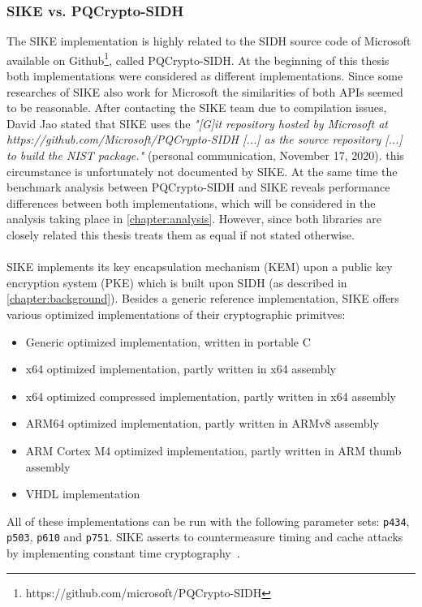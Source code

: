 \subsubsection{SIKE vs. PQCrypto-SIDH}\label{existing:sike_vs_pqcrypto}
The \gls{SIKE} implementation is highly related to the \gls{SIDH} source code of Microsoft available on Github\footnote{https://github.com/microsoft/PQCrypto-SIDH}, called \gls{PQCrypto-SIDH}. At the beginning of this thesis both implementations were considered as different implementations. Since some researches of \gls{SIKE} also work for Microsoft the similarities of both APIs seemed to be reasonable. After contacting the \gls{SIKE} team due to compilation issues, David Jao stated that \gls{SIKE} uses the \textit{"[G]it repository hosted by Microsoft at
https://github.com/Microsoft/PQCrypto-SIDH [...] as the source
repository [...] to build the NIST package."} (personal communication, November 17, 2020). this circumstance is unfortunately not documented by \gls{SIKE}. At the same time the benchmark analysis between \gls{PQCrypto-SIDH} and \gls{SIKE} reveals performance differences between both implementations, which will be considered in the analysis taking place in \autoref{chapter:analysis}. However, since both libraries are closely related this thesis treats them as equal if not stated otherwise.
\\\\
\gls{SIKE} implements its key encapsulation mechanism (\gls{KEM}) upon a public key encryption system (\gls{PKE}) which is built upon \gls{SIDH} (as described in \autoref{chapter:background}). Besides a generic reference implementation, \gls{SIKE} offers various optimized implementations of their cryptographic primitves:
\begin{itemize}
  \item Generic optimized implementation, written in portable C
  \item x64 optimized implementation, partly written in x64 assembly
  \item x64 optimized compressed implementation, partly written in x64 assembly
  \item ARM64 optimized implementation, partly written in ARMv8 assembly
  \item ARM Cortex M4 optimized implementation, partly written in ARM thumb assembly
  \item VHDL implementation
\end{itemize}
All of these implementations can be run with the following parameter sets: \texttt{p434}, \texttt{p503}, \texttt{p610} and \texttt{p751}. \gls{SIKE} asserts to countermeasure timing and cache attacks by implementing constant time cryptography~\parencite{sike2020spec}.

